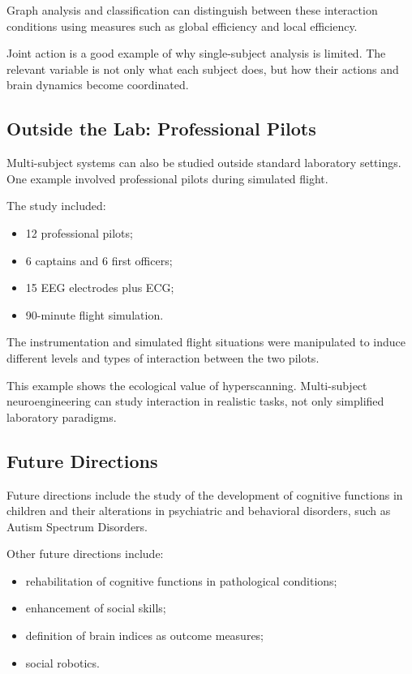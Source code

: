 Graph analysis and classification can distinguish between these interaction conditions using measures such as global efficiency and local efficiency.

\begin{authornote}
Joint action is a good example of why single-subject analysis is limited. The relevant variable is not only what each subject does, but how their actions and brain dynamics become coordinated.
\end{authornote}

\subsection{Outside the Lab: Professional Pilots}

Multi-subject systems can also be studied outside standard laboratory settings. One example involved professional pilots during simulated flight.

The study included:

\begin{itemize}[noitemsep]
    \item 12 professional pilots;
    \item 6 captains and 6 first officers;
    \item 15 EEG electrodes plus ECG;
    \item 90-minute flight simulation.
\end{itemize}

The instrumentation and simulated flight situations were manipulated to induce different levels and types of interaction between the two pilots.

\begin{authornote}
This example shows the ecological value of hyperscanning. Multi-subject neuroengineering can study interaction in realistic tasks, not only simplified laboratory paradigms.
\end{authornote}

\subsection{Future Directions}

Future directions include the study of the development of cognitive functions in children and their alterations in psychiatric and behavioral disorders, such as Autism Spectrum Disorders.

Other future directions include:

\begin{itemize}[noitemsep]
    \item rehabilitation of cognitive functions in pathological conditions;
    \item enhancement of social skills;
    \item definition of brain indices as outcome measures;
    \item social robotics.
\end{itemize}

